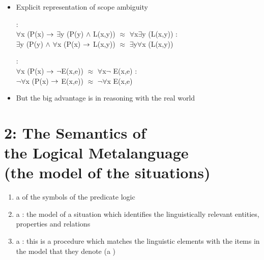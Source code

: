 \documentclass[headrule,footrule]{foils}
\begin{document}

\begin{itemize}
\item Explicit representation of scope ambiguity
  \begin{exe}
    \ex {}
    \begin{xlist}
          \ex {}:  
          \\ $\forall$x (P(x) $\rightarrow$ $\exists$y (P(y) $\wedge$
          L(x,y))
          \hfill $\approx$ \hfill  $\forall$x$\exists$y (L(x,y))
          \ex {}: 
          \\   $\exists$y (P(y) $\wedge$ $\forall$x (P(x) $\rightarrow$ L(x,y))
           \hfill $\approx$ \hfill    $\exists$y$\forall$x (L(x,y))
    \end{xlist}
    \ex {}
    \begin{xlist}
          \ex {}:  
           \\ $\forall$x (P(x)  $\rightarrow$  $\neg$E(x,e))
           \hfill $\approx$ \hfill  $\forall$x$\neg$ E(x,e)
          \ex {}:  
          \\ $\neg\forall$x (P(x)  $\rightarrow$  E(x,e))
          \hfill $\approx$ \hfill  $\neg\forall$x E(x,e)
    \end{xlist}
  \end{exe}
\item But the big advantage is in reasoning with the real world
   \\ 
\end{itemize}

\section{2: The Semantics of \\ the Logical Metalanguage\\
(the model of the situations)}


\begin{enumerate}
\item a  of the symbols of the predicate logic
\item a : the model of a situation which identifies the
  linguistically relevant entities, properties and relations
\item a : this is a procedure
  which matches the linguistic elements with the items in the model
  that they denote (a )
\end{enumerate}
\end{document}
